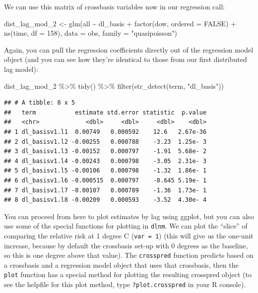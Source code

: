 \documentclass[
]{book}
\newenvironment{Shaded}{\begin{snugshade}}{\end{snugshade}}
\newcommand{\AttributeTok}[1]{\textcolor[rgb]{0.77,0.63,0.00}{#1}}
\newcommand{\ConstantTok}[1]{\textcolor[rgb]{0.00,0.00,0.00}{#1}}
\newcommand{\DecValTok}[1]{\textcolor[rgb]{0.00,0.00,0.81}{#1}}
\newcommand{\FunctionTok}[1]{\textcolor[rgb]{0.00,0.00,0.00}{#1}}
\newcommand{\NormalTok}[1]{#1}
\newcommand{\OtherTok}[1]{\textcolor[rgb]{0.56,0.35,0.01}{#1}}
\newcommand{\SpecialCharTok}[1]{\textcolor[rgb]{0.00,0.00,0.00}{#1}}
\newcommand{\StringTok}[1]{\textcolor[rgb]{0.31,0.60,0.02}{#1}}
\begin{document}
We can use this matrix of crossbasis variables now in our regression call:

\begin{Shaded}
\begin{Highlighting}[]
\NormalTok{dist\_lag\_mod\_2 }\OtherTok{\textless{}{-}} \FunctionTok{glm}\NormalTok{(all }\SpecialCharTok{\textasciitilde{}}\NormalTok{ dl\_basis }\SpecialCharTok{+} 
                        \FunctionTok{factor}\NormalTok{(dow, }\AttributeTok{ordered =} \ConstantTok{FALSE}\NormalTok{) }\SpecialCharTok{+}
                          \FunctionTok{ns}\NormalTok{(time, }\AttributeTok{df =} \DecValTok{158}\NormalTok{), }
                        \AttributeTok{data =}\NormalTok{ obs, }\AttributeTok{family =} \StringTok{"quasipoisson"}\NormalTok{)}
\end{Highlighting}
\end{Shaded}

Again, you can pull the regression coefficients directly out of the regression model object
(and you can see how they're identical to those from our first distributed lag model):

\begin{Shaded}
\begin{Highlighting}[]
\NormalTok{dist\_lag\_mod\_2 }\SpecialCharTok{\%\textgreater{}\%} 
  \FunctionTok{tidy}\NormalTok{() }\SpecialCharTok{\%\textgreater{}\%} 
  \FunctionTok{filter}\NormalTok{(}\FunctionTok{str\_detect}\NormalTok{(term, }\StringTok{"dl\_basis"}\NormalTok{))}
\end{Highlighting}
\end{Shaded}

\begin{verbatim}
## # A tibble: 8 x 5
##   term           estimate std.error statistic  p.value
##   <chr>             <dbl>     <dbl>     <dbl>    <dbl>
## 1 dl_basisv1.l1  0.00749   0.000592    12.6   2.67e-36
## 2 dl_basisv1.l2 -0.00255   0.000788    -3.23  1.25e- 3
## 3 dl_basisv1.l3 -0.00152   0.000797    -1.91  5.68e- 2
## 4 dl_basisv1.l4 -0.00243   0.000798    -3.05  2.31e- 3
## 5 dl_basisv1.l5 -0.00106   0.000798    -1.32  1.86e- 1
## 6 dl_basisv1.l6 -0.000515  0.000797    -0.645 5.19e- 1
## 7 dl_basisv1.l7 -0.00107   0.000789    -1.36  1.73e- 1
## 8 dl_basisv1.l8 -0.00209   0.000593    -3.52  4.30e- 4
\end{verbatim}

You can proceed from here to plot estimates by lag using ggplot, but you can also use
some of the special functions for plotting in \texttt{dlnm}. We can plot the ``slice'' of comparing
the relative risk at 1 degree C (\texttt{var\ =\ 1}) (this will give us the one-unit increase,
because by default the crossbasis set-up with 0 degrees as the baseline, so this is
one degree above that value). The \texttt{crosspred} function predicts based on a crossbasis
and a regression model object that uses that crossbasis, then the \texttt{plot} function has a
special method for plotting the resulting crosspred object (to see the helpfile for this
plot method, type \texttt{?plot.crosspred} in your R console).
\end{document}

